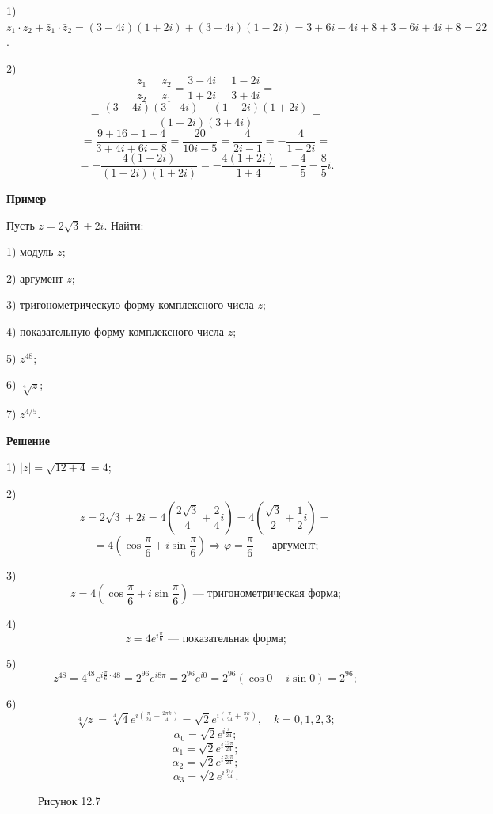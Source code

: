 \documentclass[12pt,a4paper]{article}
\begin{document}
1) $z_1\cdot z_2+\bar z_1\cdot \bar
z_2=(3-4i)(1+2i)+(3+4i)(1-2i)=3+6i-4i+8+3-6i+4i+8=22$.

2)
$$
\frac{z_1}{z_2}-\frac{\bar z_2}{\bar z_1}=\frac{3-4i}{1+2i}-\frac{1-2i}{3+4i}=
$$
$$
=\frac{(3-4i)(3+4i)-(1-2i)(1+2i)}{(1+2i)(3+4i)}=
$$
$$
=\frac{9+16-1-4}{3+4i+6i-8}=\frac{20}{10i-5}=\frac{4}{2i-1}=-\frac{4}{1-2i}=
$$
$$
=-\frac{4(1+2i)}{(1-2i)(1+2i)}=-\frac{4(1+2i)}{1+4}=-\frac45-\frac85i.
$$

\textbf{Пример}

Пусть $z=2\sqrt3+2i$. Найти:

1) модуль $z$;

2) аргумент $z$;

3) тригонометрическую форму комплексного числа $z$;

4) показательную форму комплексного числа $z$;

5) $z^{48}$;

6) $\sqrt[4]{z}$;

7) $z^{4/5}$.

\textbf{Решение}

1) $|z|=\sqrt{12+4}=4$;

2)
$$z=2\sqrt3+2i=4\left(\frac{2\sqrt3}{4}+\frac24i\right)=4\left(\frac{\sqrt3}{2}+\frac12i\right)=$$
$$
=4\left(\cos\frac{\pi}{6}+i\sin\frac{\pi}{6}\right)\Rightarrow
\varphi=\frac{\pi}{6} \text{ --- аргумент;}
$$

3) $$z=4\left(\cos\frac{\pi}{6}+i\sin\frac{\pi}{6}\right) \text{ ---
тригонометрическая форма;}$$

4) $$z=4e^{i\frac{\pi}{6}} \text{ --- показательная форма;}$$

5)
$$z^{48}=4^{48}e^{i\frac{\pi}{6}\cdot48}=2^{96}e^{i8\pi}=2^{96}e^{i0}=2^{96}(\cos0+i\sin0)=2^{96};$$

6) $$\sqrt[4]{z}=\sqrt[4]{4}e^{i\left(\frac{\pi}{24}+\frac{2\pi
k}{4}\right)}=\sqrt2e^{i\left(\frac{\pi}{24}+\frac{\pi
k}{2}\right)},\quad k=0,1,2,3;$$
$$
\alpha_0=\sqrt2e^{i\frac{\pi}{24}};
$$
$$
\alpha_1=\sqrt2e^{i\frac{13\pi}{24}};
$$
$$
\alpha_2=\sqrt2e^{i\frac{25\pi}{24}};
$$
$$
\alpha_3=\sqrt2e^{i\frac{37\pi}{24}}.
$$

\begin{figure}[H]
\centering
{}
\caption*{Рисунок 12.7}
\end{figure}
\end{document}

